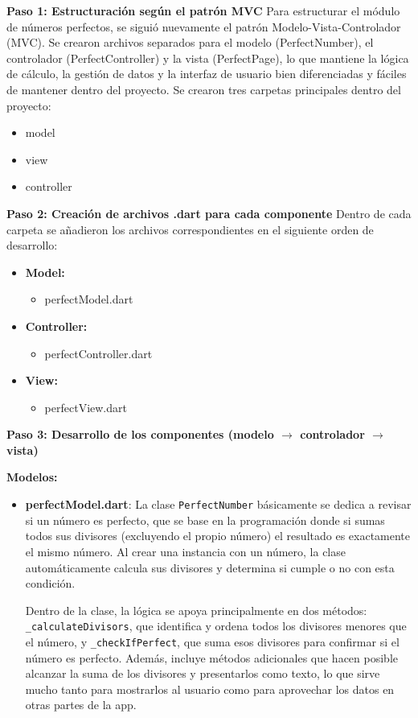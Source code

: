 \textbf{Paso 1: Estructuración según el patrón MVC}  
Para estructurar el módulo de números perfectos, se siguió nuevamente el patrón Modelo-Vista-Controlador (MVC). Se crearon archivos separados para el modelo (PerfectNumber), el controlador (PerfectController) y la vista (PerfectPage), lo que mantiene la lógica de cálculo, la gestión de datos y la interfaz de usuario bien diferenciadas y fáciles de mantener dentro del proyecto.
Se crearon tres carpetas principales dentro del proyecto:  
\begin{itemize}
    \item model
    \item view
    \item controller
\end{itemize}

\textbf{Paso 2: Creación de archivos .dart para cada componente}  
Dentro de cada carpeta se añadieron los archivos correspondientes en el siguiente orden de desarrollo:  

\begin{itemize}
    \item \textbf{Model:} 
        \begin{itemize}
            \item perfectModel.dart
        \end{itemize}
    \item \textbf{Controller:} 
        \begin{itemize}
            \item perfectController.dart
        \end{itemize}
    \item \textbf{View:} 
        \begin{itemize}
            \item perfectView.dart
        \end{itemize}
\end{itemize}

\textbf{Paso 3: Desarrollo de los componentes (modelo $\rightarrow$ controlador $\rightarrow$ vista)}  

\textbf{Modelos:}  

\begin{itemize}
    \item \textbf{perfectModel.dart}: La clase \texttt{PerfectNumber} básicamente se dedica a revisar si un número es perfecto, que se base en la programación donde si sumas todos sus divisores (excluyendo el propio número) el resultado es exactamente el mismo número. Al crear una instancia con un número, la clase automáticamente calcula sus divisores y determina si cumple o no con esta condición.

    Dentro de la clase, la lógica se apoya principalmente en dos métodos: \texttt{\_calculateDivisors}, que identifica y ordena todos los divisores menores que el número, y \texttt{\_checkIfPerfect}, que suma esos divisores para confirmar si el número es perfecto. Además, incluye métodos adicionales que hacen posible alcanzar la suma de los divisores y presentarlos como texto, lo que sirve mucho tanto para mostrarlos al usuario como para aprovechar los datos en otras partes de la app.
\end{itemize}

